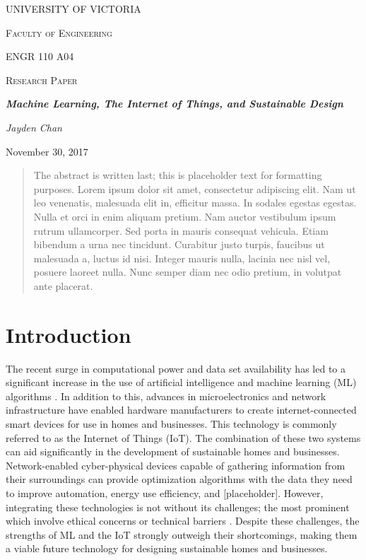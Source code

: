 \documentclass[letterpaper]{article}
\begin{document}
\begin{titlepage}
    \centering
    {\scshape\huge UNIVERSITY OF VICTORIA \par}
    \vspace{1cm}
    {\scshape\LARGE Faculty of Engineering \par\Large ENGR 110 A04\par}
    \vspace{1cm}
    {\scshape\Large Research Paper \par}
    \vspace{1.5cm}
    {\huge\bfseries \emph{Machine Learning, The Internet of Things, and Sustainable Design} \par}
    \vspace{2cm}
    {\Large\itshape Jayden Chan \par}
    \vfill
    {\large November 30, 2017\par}
\end{titlepage}

\pagestyle{customPage}

\begin{abstract}
    The abstract is written last; this is placeholder text for formatting purposes. Lorem ipsum dolor sit amet, consectetur adipiscing elit. Nam ut leo venenatis, malesuada elit in, efficitur massa. In sodales egestas egestas. Nulla et orci in enim aliquam pretium. Nam auctor vestibulum ipsum rutrum ullamcorper. Sed porta in mauris consequat vehicula. Etiam bibendum a urna nec tincidunt. Curabitur justo turpis, faucibus ut malesuada a, luctus id nisi. Integer mauris nulla, lacinia nec nisl vel, posuere laoreet nulla. Nunc semper diam nec odio pretium, in volutpat ante placerat.
\end{abstract}

\section{Introduction} \label{intro}
The recent surge in computational power and data set availability has led to a significant increase in the use of artificial intelligence and machine learning (ML) algorithms \cite{chan17}. In addition to this, advances in microelectronics and network infrastructure have enabled hardware manufacturers to create internet-connected smart devices for use in homes and businesses. This technology is commonly referred to as the Internet of Things (IoT). The combination of these two systems can aid significantly in the development of sustainable homes and businesses. Network-enabled cyber-physical devices capable of gathering information from their surroundings can provide optimization algorithms with the data they need to improve automation, energy use efficiency, and [placeholder]. However, integrating these technologies is not without its challenges; the most prominent which involve ethical concerns or technical barriers \cite{perisic16, mccalman17, vlacheas13}. Despite these challenges, the strengths of ML and the IoT strongly outweigh their shortcomings, making them a viable future technology for designing sustainable homes and businesses.
\end{document}
